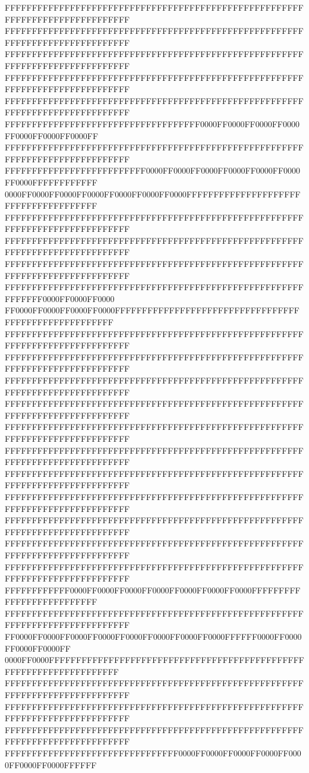 FFFFFFFFFFFFFFFFFFFFFFFFFFFFFFFFFFFFFFFFFFFFFFFFFFFFFFFFFFFFFFFFFFFFFFFFFFFFFF
FFFFFFFFFFFFFFFFFFFFFFFFFFFFFFFFFFFFFFFFFFFFFFFFFFFFFFFFFFFFFFFFFFFFFFFFFFFFFF
FFFFFFFFFFFFFFFFFFFFFFFFFFFFFFFFFFFFFFFFFFFFFFFFFFFFFFFFFFFFFFFFFFFFFFFFFFFFFF
FFFFFFFFFFFFFFFFFFFFFFFFFFFFFFFFFFFFFFFFFFFFFFFFFFFFFFFFFFFFFFFFFFFFFFFFFFFFFF
FFFFFFFFFFFFFFFFFFFFFFFFFFFFFFFFFFFFFFFFFFFFFFFFFFFFFFFFFFFFFFFFFFFFFFFFFFFFFF
FFFFFFFFFFFFFFFFFFFFFFFFFFFFFFFFFFFF0000FF0000FF0000FF0000FF0000FF0000FF0000FF
FFFFFFFFFFFFFFFFFFFFFFFFFFFFFFFFFFFFFFFFFFFFFFFFFFFFFFFFFFFFFFFFFFFFFFFFFFFFFF
FFFFFFFFFFFFFFFFFFFFFFFFFF0000FF0000FF0000FF0000FF0000FF0000FF0000FFFFFFFFFFFF
0000FF0000FF0000FF0000FF0000FF0000FF0000FFFFFFFFFFFFFFFFFFFFFFFFFFFFFFFFFFFFFF
FFFFFFFFFFFFFFFFFFFFFFFFFFFFFFFFFFFFFFFFFFFFFFFFFFFFFFFFFFFFFFFFFFFFFFFFFFFFFF
FFFFFFFFFFFFFFFFFFFFFFFFFFFFFFFFFFFFFFFFFFFFFFFFFFFFFFFFFFFFFFFFFFFFFFFFFFFFFF
FFFFFFFFFFFFFFFFFFFFFFFFFFFFFFFFFFFFFFFFFFFFFFFFFFFFFFFFFFFFFFFFFFFFFFFFFFFFFF
FFFFFFFFFFFFFFFFFFFFFFFFFFFFFFFFFFFFFFFFFFFFFFFFFFFFFFFFFFFFFF0000FF0000FF0000
FF0000FF0000FF0000FF0000FFFFFFFFFFFFFFFFFFFFFFFFFFFFFFFFFFFFFFFFFFFFFFFFFFFFFF
FFFFFFFFFFFFFFFFFFFFFFFFFFFFFFFFFFFFFFFFFFFFFFFFFFFFFFFFFFFFFFFFFFFFFFFFFFFFFF
FFFFFFFFFFFFFFFFFFFFFFFFFFFFFFFFFFFFFFFFFFFFFFFFFFFFFFFFFFFFFFFFFFFFFFFFFFFFFF
FFFFFFFFFFFFFFFFFFFFFFFFFFFFFFFFFFFFFFFFFFFFFFFFFFFFFFFFFFFFFFFFFFFFFFFFFFFFFF
FFFFFFFFFFFFFFFFFFFFFFFFFFFFFFFFFFFFFFFFFFFFFFFFFFFFFFFFFFFFFFFFFFFFFFFFFFFFFF
FFFFFFFFFFFFFFFFFFFFFFFFFFFFFFFFFFFFFFFFFFFFFFFFFFFFFFFFFFFFFFFFFFFFFFFFFFFFFF
FFFFFFFFFFFFFFFFFFFFFFFFFFFFFFFFFFFFFFFFFFFFFFFFFFFFFFFFFFFFFFFFFFFFFFFFFFFFFF
FFFFFFFFFFFFFFFFFFFFFFFFFFFFFFFFFFFFFFFFFFFFFFFFFFFFFFFFFFFFFFFFFFFFFFFFFFFFFF
FFFFFFFFFFFFFFFFFFFFFFFFFFFFFFFFFFFFFFFFFFFFFFFFFFFFFFFFFFFFFFFFFFFFFFFFFFFFFF
FFFFFFFFFFFFFFFFFFFFFFFFFFFFFFFFFFFFFFFFFFFFFFFFFFFFFFFFFFFFFFFFFFFFFFFFFFFFFF
FFFFFFFFFFFFFFFFFFFFFFFFFFFFFFFFFFFFFFFFFFFFFFFFFFFFFFFFFFFFFFFFFFFFFFFFFFFFFF
FFFFFFFFFFFFFFFFFFFFFFFFFFFFFFFFFFFFFFFFFFFFFFFFFFFFFFFFFFFFFFFFFFFFFFFFFFFFFF
FFFFFFFFFFFF0000FF0000FF0000FF0000FF0000FF0000FF0000FFFFFFFFFFFFFFFFFFFFFFFFFF
FFFFFFFFFFFFFFFFFFFFFFFFFFFFFFFFFFFFFFFFFFFFFFFFFFFFFFFFFFFFFFFFFFFFFFFFFFFFFF
FF0000FF0000FF0000FF0000FF0000FF0000FF0000FF0000FFFFFF0000FF0000FF0000FF0000FF
0000FF0000FFFFFFFFFFFFFFFFFFFFFFFFFFFFFFFFFFFFFFFFFFFFFFFFFFFFFFFFFFFFFFFFFFFF
FFFFFFFFFFFFFFFFFFFFFFFFFFFFFFFFFFFFFFFFFFFFFFFFFFFFFFFFFFFFFFFFFFFFFFFFFFFFFF
FFFFFFFFFFFFFFFFFFFFFFFFFFFFFFFFFFFFFFFFFFFFFFFFFFFFFFFFFFFFFFFFFFFFFFFFFFFFFF
FFFFFFFFFFFFFFFFFFFFFFFFFFFFFFFFFFFFFFFFFFFFFFFFFFFFFFFFFFFFFFFFFFFFFFFFFFFFFF
FFFFFFFFFFFFFFFFFFFFFFFFFFFFFFFF0000FF0000FF0000FF0000FF0000FF0000FF0000FFFFFF
